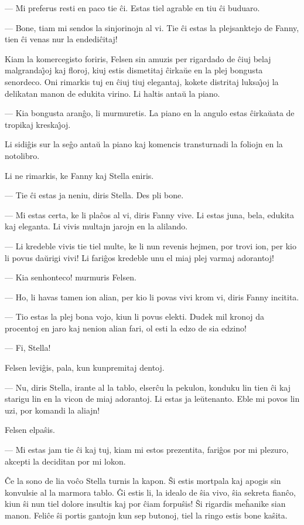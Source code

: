  --- Mi preferus resti en paco tie \^ci. Estas tiel agrable en tiu \^ci
buduaro.

 --- Bone, tiam mi sendos la sinjorinojn al vi. Tie \^ci estas la
plejsanktejo de Fanny, tien \^ci venas nur la endedi\^citaj!

   Kiam la komercegisto foriris, Felsen sin amuzis per rigardado de
\^ciuj belaj malgranda\^{\j}oj kaj floroj, kiuj estis dismetitaj
\^cirka\u ue en la plej bongusta senordeco. Oni rimarkis tuj en
\^ciuj tiuj elegantaj, kokete distritaj luksa\^{\j}oj la delikatan
manon de edukita virino. Li haltis anta\u u la piano.

 --- Kia bongusta aran\^go, li murmuretis. La piano en la angulo estas
\^cirka\u uata de tropikaj kreska\^{\j}oj.

   Li sidi\^gis sur la se\^go anta\u u la piano kaj komencis transturnadi la
foliojn en la notolibro.

   Li ne rimarkis, ke Fanny kaj Stella eniris.

 --- Tie \^ci estas ja neniu, diris Stella. Des pli bone.

 --- Mi estas certa, ke li pla\^cos al vi, diris Fanny vive. Li estas
juna, bela, edukita kaj eleganta. Li vivis multajn jarojn en la
alilando.

 --- Li kredeble vivis tie tiel multe, ke li nun revenis hejmen, por
trovi ion, per kio li povus da\u urigi vivi! Li fari\^gos kredeble
unu el miaj plej varmaj adorantoj!

 --- Kia senhonteco! murmuris Felsen.

 --- Ho, li havas tamen ion alian, per kio li povas vivi krom vi, diris
Fanny incitita.

 --- Tio estas la plej bona vojo, kiun li povus elekti. Dudek mil
kronoj da procentoj en jaro kaj nenion alian fari, ol esti la edzo
de sia edzino!

 --- Fi, Stella!

   Felsen levi\^gis, pala, kun kunpremitaj dentoj.

 --- Nu, diris Stella, irante al la tablo, elser\^cu la pekulon, konduku
lin tien \^ci kaj starigu lin en la vicon de miaj adorantoj. Li
estas ja le\u utenanto. Eble mi povos lin uzi, por komandi la
aliajn!

   Felsen elpa\^sis.

 --- Mi estas jam tie \^ci kaj tuj, kiam mi estos prezentita, fari\^gos
por mi plezuro, akcepti la deciditan por mi lokon.

   \^Ce la sono de lia vo\^co Stella turnis la kapon. \^Si estis mortpala
kaj apogis sin konvulsie al la marmora tablo. \^Gi estis li, la
idealo de \^sia vivo, \^sia sekreta fian\^co, kiun \^si nun tiel
dolore insultis kaj por \^ciam forpu\^sis! \^Si rigardis me\^hanike
sian manon. Feli\^ce \^si portis gantojn kun sep butonoj, tiel la
ringo estis bone ka\^sita.

